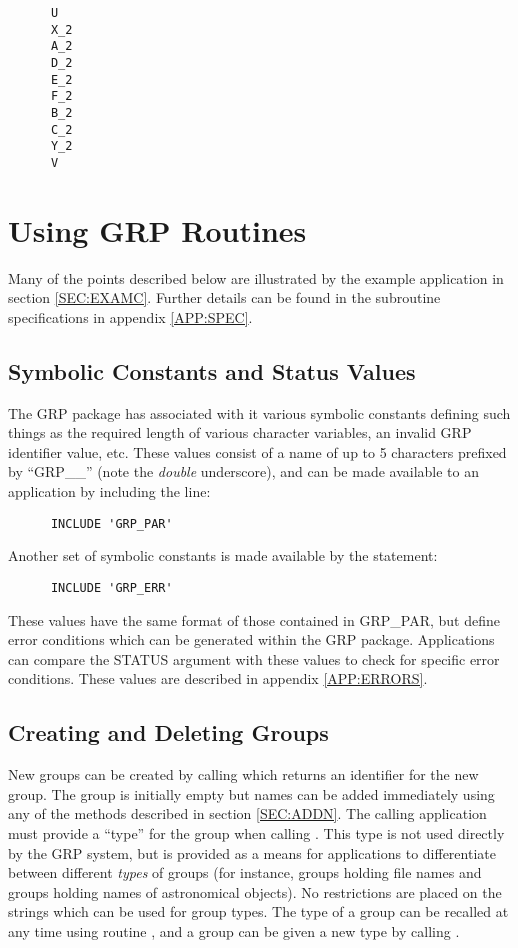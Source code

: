 \small
\begin{verbatim}
      U
      X_2
      A_2
      D_2
      E_2
      F_2
      B_2
      C_2
      Y_2
      V
\end{verbatim}
\normalsize


\section{Using GRP Routines}

Many of the points described below are illustrated by the example application in
section \ref{SEC:EXAMC}. Further details can be found in the subroutine
specifications in appendix \ref{APP:SPEC}.

\subsection{Symbolic Constants and Status Values}
The GRP package has associated with it various symbolic constants defining such
things as the required length of various character variables, an invalid GRP
identifier value, etc. These values consist of a name of up to 5 characters
prefixed by ``GRP\_\_''  (note the {\em double} underscore), and can be made
available to an application by including the line:

\small
\begin{verbatim}
      INCLUDE 'GRP_PAR'
\end{verbatim}
\normalsize

Another set of symbolic constants is made available by the
statement:

\small
\begin{verbatim}
      INCLUDE 'GRP_ERR'
\end{verbatim}
\normalsize

These values have the same format of those contained in GRP\_PAR, but define
error conditions which can be generated within the GRP package. Applications can
compare the STATUS argument with these values to check for specific error
conditions. These values are described in appendix \ref {APP:ERRORS}.

\subsection{Creating and Deleting Groups}
New groups can be created by calling  which returns an identifier for
the new group. The group is initially empty but names can be added immediately
using any of the methods described in section \ref{SEC:ADDN}. The calling
application must provide a ``type'' for the group when calling . This
type is not used directly by the GRP system, but is provided as a means for
applications to differentiate between different {\em types} of groups (for
instance, groups holding file names and groups holding names of astronomical
objects). No restrictions are placed on the strings which can be used for
group types. The type of a group can be recalled at any time using routine
, and a group can be given a new type by calling .

